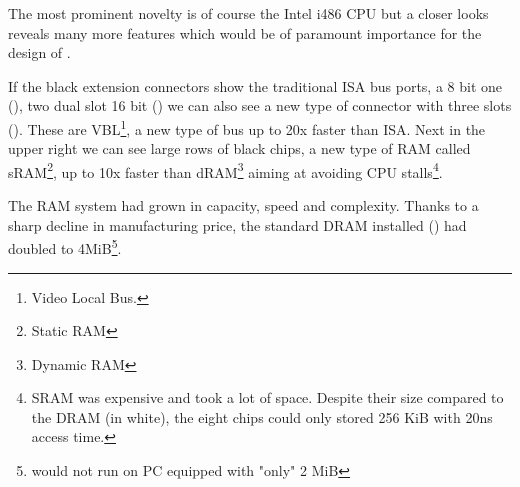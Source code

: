 \par
The most prominent novelty is of course the Intel i486 CPU but a closer looks reveals many more features which would be of paramount importance for the design of \doom.\\
\par 
If the black extension connectors show the traditional ISA bus ports, a 8 bit one (), two dual slot 16 bit () we can also see a new type of connector with three slots (). These are VBL\footnote{Video Local Bus.}, a new type of bus up to 20x faster than ISA. Next in the upper right we can see large rows of black chips, a new type of RAM called sRAM\footnote{Static RAM}, up to 10x faster than dRAM\footnote{Dynamic RAM} aiming at avoiding CPU stalls\footnote{SRAM was expensive and took a lot of space. Despite their size compared to the DRAM (in white), the eight chips could only stored 256 KiB with 20ns access time.}. \\
\par
{}
\par
The RAM system had grown in capacity, speed and complexity. Thanks to a sharp decline in manufacturing price, the standard DRAM installed () had doubled to 4MiB\footnote{\doom would not run on PC equipped with "only" 2 MiB}.\\
\par


